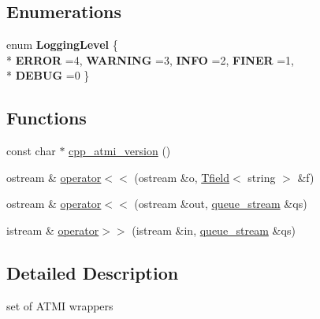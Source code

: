 \subsection*{Enumerations}
\begin{DoxyCompactItemize}
\item 
\hypertarget{namespaceatmi_aa29c2b27a3c520ac8bd57e9dbe613325}{enum {\bfseries Logging\+Level} \{ \\*
{\bfseries E\+R\+R\+O\+R} =4, 
{\bfseries W\+A\+R\+N\+I\+N\+G} =3, 
{\bfseries I\+N\+F\+O} =2, 
{\bfseries F\+I\+N\+E\+R} =1, 
\\*
{\bfseries D\+E\+B\+U\+G} =0
 \}}\label{namespaceatmi_aa29c2b27a3c520ac8bd57e9dbe613325}

\end{DoxyCompactItemize}
\subsection*{Functions}
\begin{DoxyCompactItemize}
\item 
const char $\ast$ \hyperlink{namespaceatmi_a1db5d7cd1f711e43cd63dedbd9e3f8d1}{cpp\+\_\+atmi\+\_\+version} ()
\item 
ostream \& \hyperlink{namespaceatmi_aaf1bf620dc4ebad71a8f2b98e45107e3}{operator$<$$<$} (ostream \&o, \hyperlink{classatmi_1_1_tfield}{Tfield}$<$ string $>$ \&f)
\item 
ostream \& \hyperlink{namespaceatmi_af3fe9481b5d6e19d1fb56e27baff2154}{operator$<$$<$} (ostream \&out, \hyperlink{classatmi_1_1queue__stream}{queue\+\_\+stream} \&qs)
\item 
istream \& \hyperlink{namespaceatmi_adb0ca17e8de1eecddb5c95b86441ffdc}{operator$>$$>$} (istream \&in, \hyperlink{classatmi_1_1queue__stream}{queue\+\_\+stream} \&qs)
\end{DoxyCompactItemize}


\subsection{Detailed Description}
set of A\+T\+M\+I wrappers 


